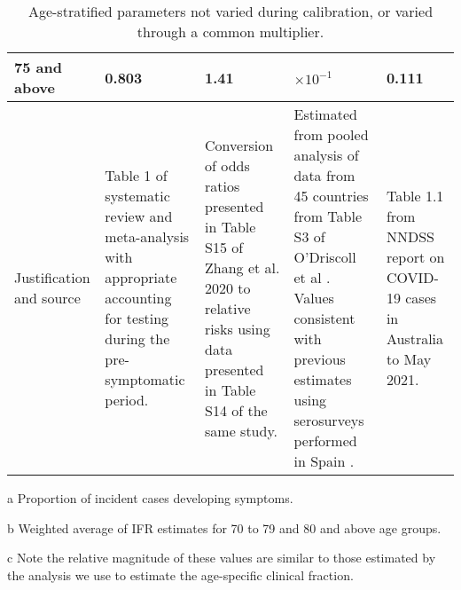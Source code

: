 \begin{table}
\begin{threeparttable}
\begin{tabularx}{\textwidth}{| X | X | X | X | X |}
        \hline
        75 and above & 0.803 & 1.41 & $\times10^{-1}$\tnote{b} & 0.111 \\
        \hline
        Justification and source & 
        Table 1 of systematic review and meta-analysis with appropriate accounting for testing during the pre-symptomatic period\cite{sah-2021}. & 
        Conversion of odds ratios presented in Table S15 of Zhang et al. 2020 to relative risks using data presented in Table S14 of the same study\cite{zhang-2020-a}\tnote{c}. &
        Estimated from pooled analysis of data from 45 countries from Table S3 of O'Driscoll et al \cite{odriscoll-2021}. 
        Values consistent with previous estimates using serosurveys performed in Spain \cite{pollan-2020}. &
        Table 1.1 from NNDSS report on COVID-19 cases in Australia to May 2021. \\ 
        \hline
	\end{tabularx}
	\caption{Age-stratified parameters not varied during calibration, or varied through a common multiplier.}
	\label{tab:age_params}
    \begin{tablenotes}
        \item[a] Proportion of incident cases developing symptoms.
        \item[b] Weighted average of IFR estimates for 70 to 79 and 80 and above age groups.
        \item[c] Note the relative magnitude of these values are similar to those estimated by the analysis we use to estimate the age-specific clinical fraction.
    \end{tablenotes}
    \end{threeparttable}
\end{table}
